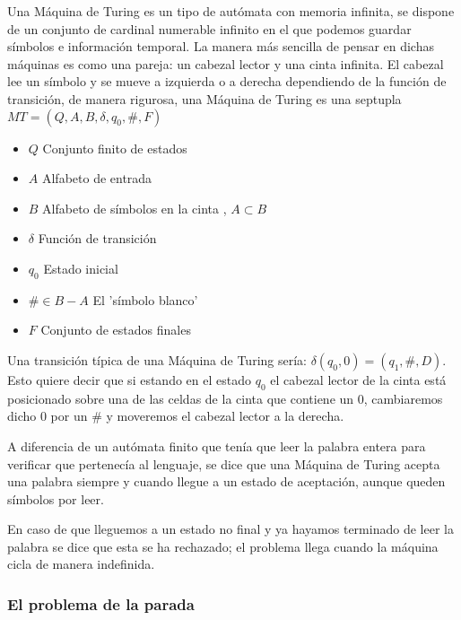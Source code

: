  Una Máquina de Turing es un tipo de autómata con memoria infinita, se dispone de un conjunto de cardinal numerable infinito en el que podemos guardar símbolos e información temporal. La manera más sencilla de pensar en dichas máquinas es como una pareja: un cabezal lector y una cinta infinita. El cabezal lee un símbolo y se mueve a izquierda o a derecha dependiendo de la función de transición, de manera rigurosa, una Máquina de Turing es una septupla $MT=(Q,A,B,\delta,q_0,\#,F)$


\begin{multicols}{2}
	\begin{itemize}
		\item $Q$  Conjunto finito de estados
		\item $A$  Alfabeto de entrada
		\item $B$  Alfabeto de símbolos en la cinta , $A\subset B$
		\item $\delta$ Función de transición
		\item $q_0$ Estado inicial
		\item $\# \in B-A$ El 'símbolo blanco'	
		\item $F$ Conjunto de estados finales 
	\end{itemize}
\end{multicols} 
 
 
 Una transición típica de una Máquina de Turing sería: $\delta(q_0,0)=(q_1,\#,D)$. Esto quiere decir que si estando en el estado $q_0$ el cabezal lector de la cinta está posicionado sobre una de las celdas de la cinta que contiene un 0, cambiaremos dicho 0 por un $\#$ y moveremos el cabezal lector a la derecha.
 
 \vspace{10px}
 
 A diferencia de un autómata finito que tenía que leer la palabra entera para verificar que pertenecía al lenguaje, se dice que una Máquina de Turing acepta una palabra siempre y cuando llegue a un estado de aceptación, aunque queden símbolos por leer.
 
 \vspace{10px}
 
 En caso de que lleguemos a un estado no final y ya hayamos terminado de leer la palabra se dice que esta se ha rechazado; el problema llega cuando la máquina cicla de manera indefinida.


\subsubsection{El problema de la parada}


